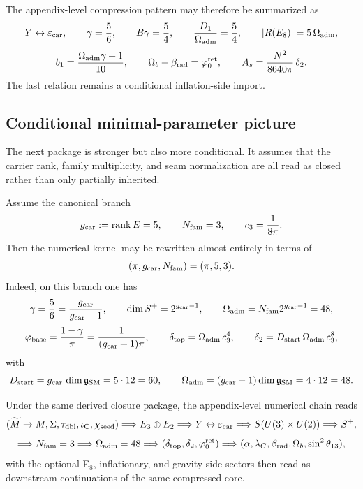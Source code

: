 \begin{remark}
The appendix-level compression pattern may therefore be summarized as
\[
Y \leftrightarrow \varepsilon_{\mathrm{car}},
\qquad
\gamma=\frac56,
\qquad
B\gamma=\frac54,
\qquad
\frac{D_1}{\Omega_{\mathrm{adm}}}=\frac54,
\qquad
|R(E_8)|=5\,\Omega_{\mathrm{adm}},
\]
\[
b_1=\frac{\Omega_{\mathrm{adm}}\gamma+1}{10},
\qquad
\Omega_b+\beta_{\mathrm{rad}}=\varphi_0^{\mathrm{ret}},
\qquad
A_s=\frac{N^2}{8640\pi}\,\delta_2.
\]
The last relation remains a conditional inflation-side import.
\end{remark}

\subsection{Conditional minimal-parameter picture}

The next package is stronger but also more conditional. It assumes that the carrier rank, family multiplicity, and seam normalization are all read as closed rather than only partially inherited.

\begin{principle}
Assume the canonical branch
\[
g_{\mathrm{car}}:=\operatorname{rank} E=5,
\qquad
N_{\mathrm{fam}}=3,
\qquad
c_3=\frac{1}{8\pi}.
\]
Then the numerical kernel may be rewritten almost entirely in terms of
\[
(\pi,g_{\mathrm{car}},N_{\mathrm{fam}})=(\pi,5,3).
\]
Indeed, on this branch one has
\[
\gamma=\frac56=\frac{g_{\mathrm{car}}}{g_{\mathrm{car}}+1},
\qquad
\dim S^+=2^{g_{\mathrm{car}}-1},
\qquad
\Omega_{\mathrm{adm}}=N_{\mathrm{fam}}2^{g_{\mathrm{car}}-1}=48,
\]
\[
\varphi_{\mathrm{base}}=\frac{1-\gamma}{\pi}=\frac{1}{(g_{\mathrm{car}}+1)\pi},
\qquad
\delta_{\mathrm{top}}=\Omega_{\mathrm{adm}}\,c_3^4,
\qquad
\delta_2=D_{\mathrm{start}}\,\Omega_{\mathrm{adm}}\,c_3^8,
\]
with
\[
D_{\mathrm{start}}=g_{\mathrm{car}}\,\dim\mathfrak g_{\mathrm{SM}}=5\cdot 12=60,
\qquad
\Omega_{\mathrm{adm}}=(g_{\mathrm{car}}-1)\dim\mathfrak g_{\mathrm{SM}}=4\cdot 12=48.
\]
\end{principle}

\begin{remark}
Under the same derived closure package, the appendix-level numerical chain reads
\[
(\widetilde M\to M,\Sigma,\tau_{\mathrm{dbl}},\iota_{\mathrm C},\chi_{\mathrm{seed}})
\Longrightarrow
E_3\oplus E_2
\Longrightarrow
Y \leftrightarrow \varepsilon_{\mathrm{car}}
\Longrightarrow
S(U(3)\times U(2))
\Longrightarrow
S^+,
\]
\[
\Longrightarrow
N_{\mathrm{fam}}=3
\Longrightarrow
\Omega_{\mathrm{adm}}=48
\Longrightarrow
(\delta_{\mathrm{top}},\delta_2,\varphi_0^{\mathrm{ret}})
\Longrightarrow
(\alpha,\lambda_C,\beta_{\mathrm{rad}},\Omega_b,\sin^2\theta_{13}),
\]
with the optional E$_8$, inflationary, and gravity-side sectors then read as downstream continuations of the same compressed core.
\end{remark}

